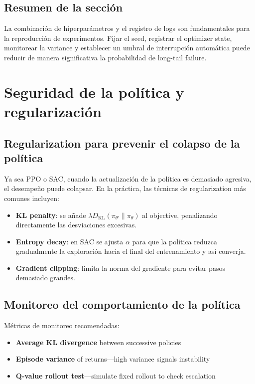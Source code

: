 \documentclass[a4paper]{article}
\begin{document}
\subsection{Resumen de la sección}

La combinación de hiperparámetros y el registro de logs son fundamentales para la reproducción de experimentos. Fijar el seed, registrar el optimizer state, monitorear la variance y establecer un umbral de interrupción automática puede reducir de manera significativa la probabilidad de long-tail failure.
\section{Seguridad de la política y regularización}

\subsection{Regularization para prevenir el colapso de la política}

Ya sea PPO o SAC, cuando la actualización de la política es demasiado agresiva, el desempeño puede colapsar. En la práctica, las técnicas de regularization más comunes incluyen:

\begin{itemize}
    \item \textbf{KL penalty}: se añade $\lambda D_{\mathrm{KL}}(\pi_{\theta'}\|\pi_\theta)$ al objective, penalizando directamente las desviaciones excesivas.
    \item \textbf{Entropy decay}: en SAC se ajusta $\alpha$ para que la política reduzca gradualmente la exploración hacia el final del entrenamiento y así converja.
    \item \textbf{Gradient clipping}: limita la norma del gradiente para evitar pasos demasiado grandes.
\end{itemize}

\subsection{Monitoreo del comportamiento de la política}

Métricas de monitoreo recomendadas:

\begin{itemize}
    \item \textbf{Average KL divergence} between successive policies
    \item \textbf{Episode variance} of returns—high variance signals instability
    \item \textbf{Q-value rollout test}—simulate fixed rollout to check escalation
\end{itemize}
\end{document}

